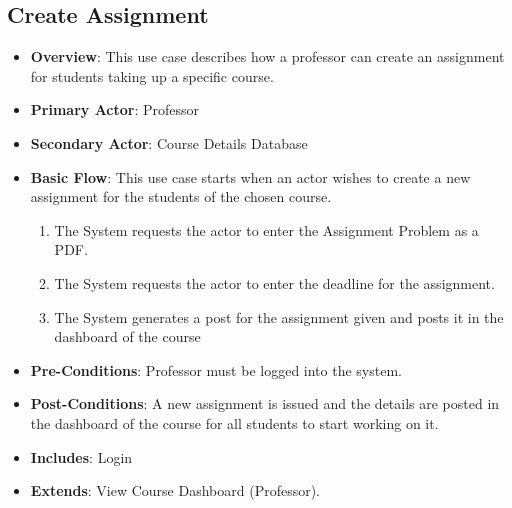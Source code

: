 \documentclass[12pt, a4]{article}
\begin{document}
\subsection{Create Assignment}
\begin{itemize}
    \item \textbf{Overview}: This use case describes how a professor can create an assignment for students taking up a specific course.
    \item \textbf{Primary Actor}: Professor
    \item \textbf{Secondary Actor}: Course Details Database
    \item \textbf{Basic Flow}: This use case starts when an actor wishes to create a new assignment for the students of the chosen course.
        \begin{enumerate}
            \item The System requests the actor to enter the Assignment Problem as a PDF.
            \item The System requests the actor to enter the deadline for the assignment.
            \item The System generates a post for the assignment given and posts it in the dashboard of the course
        \end{enumerate}
    \item \textbf{Pre-Conditions}: Professor must be logged into the system.
    \item \textbf{Post-Conditions}: A new assignment is issued and the details are posted in the dashboard of the course for all students to start working on it.
    \item \textbf{Includes}: Login
    \item \textbf{Extends}: View Course Dashboard (Professor).
\end{itemize}

\end{document}
